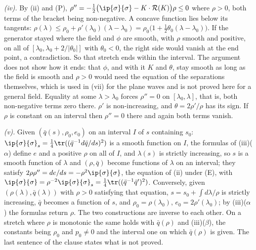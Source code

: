 \emph{(iv).} By (ii) and (P), $\rho'' = -\tfrac12\bigl(\ip{\sigma}{\sigma} - K \cdot \mathcal{R}(K)\bigr)\rho \leq 0$ where $\rho > 0$, both terms of the bracket being non-negative. A concave function lies below its tangents: $\rho(\lambda) \leq \rho_{0} + \rho'(\lambda_{0})(\lambda - \lambda_{0}) = \rho_{0}\bigl(1 + \tfrac12\theta_{0}(\lambda - \lambda_{0})\bigr)$. If the generator stayed where the field and $\phi$ are smooth, with $\rho$ smooth and positive, on all of $[\lambda_{0}, \lambda_{0} + 2/|\theta_{0}|]$ with $\theta_{0} < 0$, the right side would vanish at the end point, a contradiction. So that stretch ends within the interval. The argument does not show how it ends: that $\phi$, and with it $K$ and $\theta$, stay smooth as long as the field is smooth and $\rho > 0$ would need the equation of the separations themselves, which is used in (vii) for the plane waves and is not proved here for a general field. Equality at some $\lambda > \lambda_{0}$ forces $\rho'' = 0$ on $[\lambda_{0}, \lambda]$, that is, both non-negative terms zero there. $\rho'$ is non-increasing, and $\theta = 2\rho'/\rho$ has its sign. If $\rho$ is constant on an interval then $\rho'' = 0$ there and again both terms vanish.

\emph{(v).} Given $(\bar q(s), \rho_{0}, e_{0})$ on an interval $I$ of $s$ containing $s_{0}$: $\ip{\sigma}{\sigma}_{s} = \tfrac14\tr((\bar q^{-1}d\bar q/ds)^{2})$ is a smooth function on $I$, the formulas of (iii)($\alpha$) define $e$ and a positive $\rho$ on all of $I$, and $\lambda(s)$ is strictly increasing, so $s$ is a smooth function of $\lambda$ and $(\rho, \bar q)$ become functions of $\lambda$ on an interval; they satisfy $2\rho\rho'' = de/ds = -\rho^{2}\ip{\sigma}{\sigma}$, the equation of (ii) under (E), with $\ip{\sigma}{\sigma} = \rho^{-2}\ip{\sigma}{\sigma}_{s} = \tfrac14\tr((\bar q^{-1}\bar q')^{2})$. Conversely, given $(\rho(\lambda), \bar q(\lambda))$ with $\rho > 0$ satisfying that equation, $s = s_{0} + \int d\lambda/\rho$ is strictly increasing, $\bar q$ becomes a function of $s$, and $\rho_{0} = \rho(\lambda_{0})$, $e_{0} = 2\rho'(\lambda_{0})$; by (iii)($\alpha$) the formulas return $\rho$. The two constructions are inverse to each other. On a stretch where $\rho$ is monotonic the same holds with $\bar q(\rho)$ and (iii)($\beta$), the constants being $\rho_{0}$ and $p_{0} \neq 0$ and the interval one on which $\bar q(\rho)$ is given. The last sentence of the clause states what is not proved.

